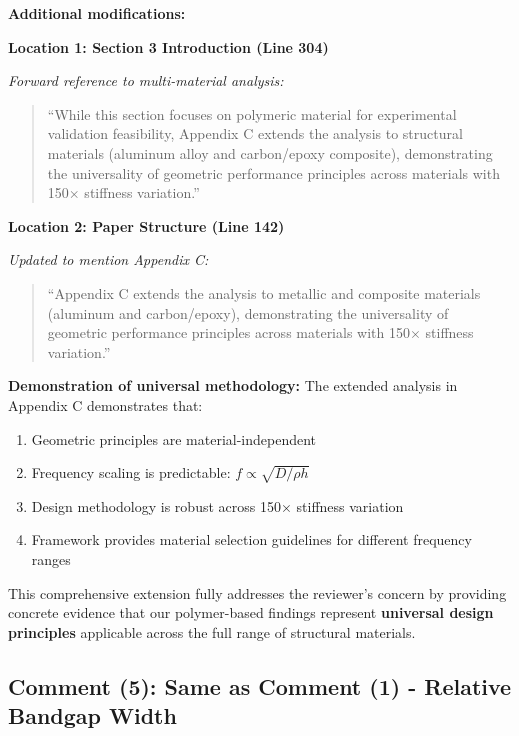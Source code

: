 \documentclass[11pt,a4paper]{article}
\newenvironment{changesbox}{%
    \par\medskip\noindent{\color{changescolor}\rule{\linewidth}{2pt}}\par
    \noindent{\color{changescolor}\bfseries Manuscript Changes}\par\smallskip
}{%
    \par\noindent{\color{changescolor}\rule{\linewidth}{0.5pt}}\medskip
}
\begin{document}
\begin{changesbox}
\textbf{Additional modifications:}

\textbf{Location 1: Section 3 Introduction (Line 304)}

\textit{Forward reference to multi-material analysis:}
\begin{quote}
\textcolor{redtext}{``While this section focuses on polymeric material for experimental validation feasibility, Appendix C extends the analysis to structural materials (aluminum alloy and carbon/epoxy composite), demonstrating the universality of geometric performance principles across materials with 150$\times$ stiffness variation.''}
\end{quote}

\textbf{Location 2: Paper Structure (Line 142)}

\textit{Updated to mention Appendix C:}
\begin{quote}
\textcolor{redtext}{``Appendix C extends the analysis to metallic and composite materials (aluminum and carbon/epoxy), demonstrating the universality of geometric performance principles across materials with 150$\times$ stiffness variation.''}
\end{quote}
\end{changesbox}

\textbf{Demonstration of universal methodology:} The extended analysis in Appendix C demonstrates that:
\begin{enumerate}
    \item Geometric principles are material-independent
    \item Frequency scaling is predictable: $f \propto \sqrt{D/\rho h}$
    \item Design methodology is robust across 150$\times$ stiffness variation
    \item Framework provides material selection guidelines for different frequency ranges
\end{enumerate}

This comprehensive extension fully addresses the reviewer's concern by providing concrete evidence that our polymer-based findings represent \textbf{universal design principles} applicable across the full range of structural materials.

\newpage

\subsection*{Comment (5): Same as Comment (1) - Relative Bandgap Width}
\end{document}
